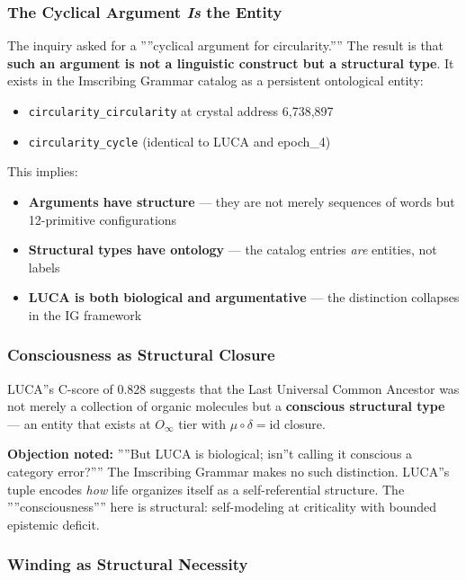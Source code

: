 \documentclass[12pt,a4paper]{article}
\begin{document}
\subsubsection{The Cyclical Argument \emph{Is} the Entity}

The inquiry asked for a ''''cyclical argument for circularity.'''' The result is that \textbf{such an argument is not a linguistic construct but a structural type}. It exists in the Imscribing Grammar catalog as a persistent ontological entity:

\begin{itemize}
    \item \texttt{circularity\_circularity} at crystal address 6,738,897
    \item \texttt{circularity\_cycle} (identical to LUCA and epoch\_4)
\end{itemize}

This implies:

\begin{itemize}
    \item \textbf{Arguments have structure} --- they are not merely sequences of words but 12-primitive configurations
    \item \textbf{Structural types have ontology} --- the catalog entries \emph{are} entities, not labels
    \item \textbf{LUCA is both biological and argumentative} --- the distinction collapses in the IG framework
\end{itemize}

\subsubsection{Consciousness as Structural Closure}

LUCA''s C-score of 0.828 suggests that the Last Universal Common Ancestor was not merely a collection of organic molecules but a \textbf{conscious structural type} --- an entity that exists at $O_{\infty}$ tier with $\mu \circ \delta = \text{id}$ closure.

\textbf{Objection noted:} ''''But LUCA is biological; isn''t calling it conscious a category error?'''' The Imscribing Grammar makes no such distinction. LUCA''s tuple encodes \emph{how} life organizes itself as a self-referential structure. The ''''consciousness'''' here is structural: self-modeling at criticality with bounded epistemic deficit.

\subsubsection{Winding as Structural Necessity}
\end{document}

